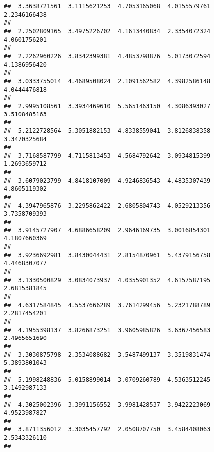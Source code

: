 \documentclass[]{article}
\begin{document}
\begin{verbatim}
##  3.3638721561  3.1115621253  4.7053165068  4.0155579761  2.2346166438 
##                                                                       
##  2.2502809165  3.4975226702  4.1613440834  2.3354072324  4.0601756201 
##                                                                       
##  2.2262960226  3.8342399381  4.4853798876  5.0173072594  4.1386956420 
##                                                                       
##  3.0333755014  4.4689508024  2.1091562582  4.3982586148  4.0444476818 
##                                                                       
##  2.9995108561  3.3934469610  5.5651463150  4.3086393027  3.5108485163 
##                                                                       
##  5.2122728564  5.3051882153  4.8338559041  3.8126838358  3.3470325684 
##                                                                       
##  3.7168587799  4.7115813453  4.5684792642  3.0934815399  1.2693659712 
##                                                                       
##  3.6079023799  4.8418107009  4.9246836543  4.4835307439  4.8605119302 
##                                                                       
##  4.3947965876  3.2295862422  2.6805804743  4.0529213356  3.7358709393 
##                                                                       
##  3.9145727907  4.6886658209  2.9646169735  3.0016854301  4.1807660369 
##                                                                       
##  3.9236692981  3.8430044431  2.8154870961  5.4379156758  4.4468307077 
##                                                                       
##  3.1330500829  3.0834073937  4.0355901352  4.6157587195  2.6815381845 
##                                                                       
##  4.6317584845  4.5537666289  3.7614299456  5.2321788789  2.2817454201 
##                                                                       
##  4.1955398137  3.8266873251  3.9605985826  3.6367456583  2.4965651690 
##                                                                       
##  3.3030875798  2.3534088682  3.5487499137  3.3519831474  5.3893801043 
##                                                                       
##  5.1998248836  5.0158899014  3.0709260789  4.5363512245  3.1492987133 
##                                                                       
##  4.3025002396  3.3991156552  3.9981428537  3.9422223069  4.9523987827 
##                                                                       
##  3.8711356012  3.3035457792  2.0508707750  3.4584408063  2.5343326110 
##                                                                       

\end{verbatim}
\end{document}
